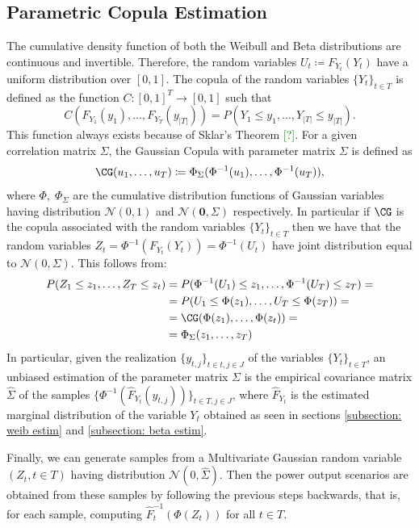 {\subsection{Parametric Copula Estimation}
The cumulative density function of both the Weibull and Beta distributions are continuous and invertible. 
Therefore, the random variables \( U_t \coloneqq F_{Y_t}(Y_t) \) have a uniform distribution over \([0,1]\). 
The copula of the random variables \(\{Y_t\}_{t \in T}\) is defined as the function \(C: [0,1]^T \to [0,1]\) such that 
\begin{equation}
C(F_{Y_1}(y_1), \ldots, F_{Y_T}(y_{|T|})) = P(Y_1 \leq y_1, \ldots, Y_{|T|} \leq y_{|T|}).
\end{equation}
This function always exists because of Sklar's Theorem \textcolor{green}{[?]}. 
For a given correlation matrix \(\Sigma\), the Gaussian Copula with parameter matrix \(\Sigma\) is defined as 
\[\CG(u_1,\ldots,u_{T}) \coloneqq \Phi_{\Sigma}(\Phi^{-1}(u_1),\ldots, \Phi^{-1}(u_T)),\] 
where \(\Phi,\; \Phi_{\Sigma}\) are the cumulative distribution functions of Gaussian variables having distribution \(\mathcal{N}(0,1)\) and \( \mathcal{N}(\mathbf{0},\Sigma)\) respectively. 
In particular if \(\CG\) is the copula associated with the random variables \(\{Y_t\}_{t \in T}\) then we have that the random variables \(Z_t = \Phi^{-1}(F_{Y_t}(Y_t)) = \Phi^{-1}(U_t)\) have joint distribution equal to \(\mathcal{N}(0, \Sigma)\). 
This follows from:
\begin{align*}
P(Z_1 \leq z_1, \ldots, Z_T \leq z_t) &= P(\Phi^{-1}(U_1) \leq z_1, \ldots, \Phi^{-1}(U_T) \leq z_T) = \\
&= P(U_1 \leq \Phi(z_1), \ldots, U_T \leq \Phi(z_T)) = \\
&= \CG(\Phi(z_1), \ldots, \Phi(z_t)) =  \\
&= \Phi_{\Sigma}(z_1, \ldots, z_T)
\end{align*}
In particular, given the realization \(\{y_{t,j}\}_{t \in t, j \in J}\) of the variables \(\{Y_t\}_{t \in T}\), an unbiased estimation of the parameter matrix \(\Sigma\) is the empirical covariance matrix \(\hat \Sigma\) of the samples \(\{\Phi^{-1}(\hat{F}_{Y_t}(y_{t,j}))\}_{t\in T, j \in J}\), where \(\hat{F}_{Y_t}\) is the estimated marginal distribution of the variable \(Y_t\) obtained as seen in sections \ref{subsection: weib estim} and \ref{subsection: beta estim}.

Finally, we can generate samples from a Multivariate Gaussian random variable \((Z_{t}, t \in T)\) having distribution \(\mathcal{N}(0, \hat \Sigma)\).
Then the power output scenarios are obtained from these samples by following the previous steps backwards, that is, for each sample, computing \(\hat F_{t}^{-1}(\Phi(Z_{t}))\) for all \(t\in T\). 













}
